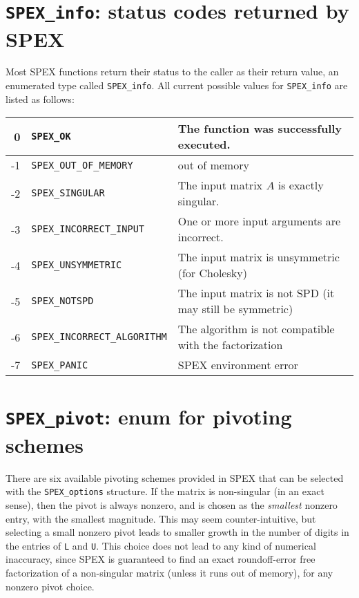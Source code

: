 \documentclass[12pt]{report}
\theoremstyle{definition}
\begin{document}
\section{\texttt{SPEX\_info}: status codes returned by SPEX}
\label{ss:SPEX_info}

Most SPEX functions return their status to the caller as their return value,
an enumerated type called \verb|SPEX_info|. All current possible values for
\verb|SPEX_info| are listed as follows:

\begin{center}
\begin{tabular}{rll}
\hline
    0& \verb|SPEX_OK|& The function was successfully executed.\\
\hline
    -1& \verb|SPEX_OUT_OF_MEMORY|& out of memory\\
\hline
    -2& \verb|SPEX_SINGULAR|& The input matrix $A$ is exactly singular.\\
\hline
    -3& \verb|SPEX_INCORRECT_INPUT|& One or more input arguments are incorrect.\\
\hline
    -4& \verb|SPEX_UNSYMMETRIC|& The input matrix is unsymmetric (for Cholesky)\\
\hline
    -5 & \verb|SPEX_NOTSPD| & The input matrix is not SPD (it may still be symmetric) \\
\hline
    -6 & \verb|SPEX_INCORRECT_ALGORITHM| & The algorithm is not compatible with the factorization \\
\hline
    -7& \verb|SPEX_PANIC| & SPEX environment error \\
\hline
\end{tabular}
\end{center}

\section{\texttt{SPEX\_pivot}: enum for pivoting schemes}
\label{ss:SPEX_pivot}

There are six available pivoting schemes provided in SPEX that can be
selected with the \verb|SPEX_options| structure.  If the matrix is non-singular
(in an exact sense), then the pivot is always nonzero, and is chosen as the
{\em smallest} nonzero entry, with the smallest magnitude.  This may seem
counter-intuitive, but selecting a small nonzero pivot leads to smaller growth
in the number of digits in the entries of \verb|L| and \verb|U|.  This choice
does not lead to any kind of numerical inaccuracy, since SPEX is guaranteed
to find an exact roundoff-error free factorization of a non-singular matrix
(unless it runs out of memory), for any nonzero pivot choice.
\end{document}
